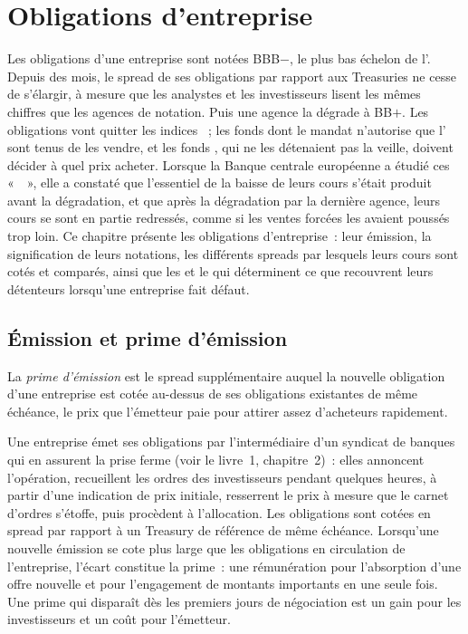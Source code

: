 \chapter{Obligations d'entreprise}\label{ch:m2:corporate-bonds}

Les obligations d'une entreprise sont notées BBB$-$, le plus bas échelon de l'. Depuis
des mois, le spread de ses obligations par rapport aux Treasuries ne cesse de s'élargir, à mesure que les analystes et
les investisseurs lisent les mêmes chiffres que les agences de notation. Puis une agence la dégrade
à BB$+$. Les obligations vont quitter les indices ~; les fonds dont
le mandat n'autorise que l' sont tenus de les vendre, et les fonds , qui ne les détenaient pas la veille, doivent décider à quel prix
acheter. Lorsque la Banque centrale européenne a étudié ces «~~», elle a constaté
que l'essentiel de la baisse de leurs cours s'était produit avant la dégradation, et que
après la dégradation par la dernière agence, leurs cours se sont en partie redressés, comme si
les ventes forcées les avaient poussés trop loin. Ce chapitre présente les
obligations d'entreprise~: leur émission, la signification de leurs notations, les différents spreads
par lesquels leurs cours sont cotés et comparés, ainsi que les  et le  qui
déterminent ce que recouvrent leurs détenteurs lorsqu'une entreprise fait défaut.

\section{Émission et prime d'émission}

\begin{definition}\label{def:m2:corporate-bonds:nic}
La \emph{prime d'émission} est le spread supplémentaire
auquel la nouvelle obligation d'une entreprise est cotée au-dessus de ses obligations existantes
de même échéance, le prix que l'émetteur paie pour attirer assez d'acheteurs rapidement.
\end{definition}

Une entreprise émet ses obligations par l'intermédiaire d'un syndicat de banques qui en assurent la prise ferme (voir
le livre~1, chapitre~2)~: elles annoncent l'opération, recueillent les ordres des investisseurs pendant
quelques heures, à partir d'une indication de prix initiale, resserrent le prix à mesure que le carnet
d'ordres s'étoffe, puis procèdent à l'allocation. Les obligations sont cotées en spread par rapport
à un Treasury de référence de même échéance. Lorsqu'une nouvelle émission se cote plus large que les
obligations en circulation de l'entreprise, l'écart constitue la prime~: une rémunération pour l'absorption d'une offre nouvelle
et pour l'engagement de montants importants en une seule fois. Une prime qui disparaît dès les premiers
jours de négociation est un gain pour les investisseurs et un coût pour l'émetteur.


